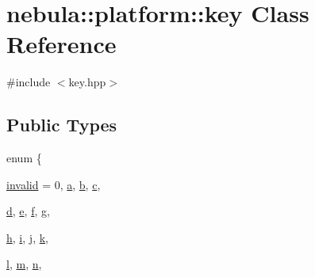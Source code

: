 \hypertarget{classnebula_1_1platform_1_1key}{
\section{nebula::platform::key Class Reference}
\label{classnebula_1_1platform_1_1key}
}


{\ttfamily \#include $<$key.hpp$>$}\subsection*{Public Types}
\begin{DoxyCompactItemize}
\item 
enum \{ \par
\hyperlink{classnebula_1_1platform_1_1key_a1e8e89eec822fa503cad8fdee1ffe81daf4e440bf9920607f965f98e4f693991a}{invalid} =  0, 
\hyperlink{classnebula_1_1platform_1_1key_a1e8e89eec822fa503cad8fdee1ffe81da3a547ef682c6c9f2fd369c507d840ad2}{a}, 
\hyperlink{classnebula_1_1platform_1_1key_a1e8e89eec822fa503cad8fdee1ffe81da70b6d7aff08309dea5ca4571d644575e}{b}, 
\hyperlink{classnebula_1_1platform_1_1key_a1e8e89eec822fa503cad8fdee1ffe81daa41f12fef0bf40fdeff6e5d124c24847}{c}, 
\par
\hyperlink{classnebula_1_1platform_1_1key_a1e8e89eec822fa503cad8fdee1ffe81dae37ffebee8fe750c58300b8d5a584e1e}{d}, 
\hyperlink{classnebula_1_1platform_1_1key_a1e8e89eec822fa503cad8fdee1ffe81dabbba1f5c8364befe1a0c923536232983}{e}, 
\hyperlink{classnebula_1_1platform_1_1key_a1e8e89eec822fa503cad8fdee1ffe81daafe4cae3906d9a5e61e79359f9f9439e}{f}, 
\hyperlink{classnebula_1_1platform_1_1key_a1e8e89eec822fa503cad8fdee1ffe81dafa619d2ef468c8ba678c897b6ec3686c}{g}, 
\par
\hyperlink{classnebula_1_1platform_1_1key_a1e8e89eec822fa503cad8fdee1ffe81da28ec1e51592c38ccf52aed89b60b95be}{h}, 
\hyperlink{classnebula_1_1platform_1_1key_a1e8e89eec822fa503cad8fdee1ffe81dabe8a1302593e2da16d0a9b1b6c330c7d}{i}, 
\hyperlink{classnebula_1_1platform_1_1key_a1e8e89eec822fa503cad8fdee1ffe81da283f86ac479d02db5443de3ec65e5a6d}{j}, 
\hyperlink{classnebula_1_1platform_1_1key_a1e8e89eec822fa503cad8fdee1ffe81da2c690ee231660b5d5378147c42231ac7}{k}, 
\par
\hyperlink{classnebula_1_1platform_1_1key_a1e8e89eec822fa503cad8fdee1ffe81da061491f8233235d55b994f061db76283}{l}, 
\hyperlink{classnebula_1_1platform_1_1key_a1e8e89eec822fa503cad8fdee1ffe81da58c873bdaf009d7a9a8d5e25075ceff3}{m}, 
\hyperlink{classnebula_1_1platform_1_1key_a1e8e89eec822fa503cad8fdee1ffe81da1fb952d56f84ce4a06568fb1dcf8818a}{n}, 

\end{DoxyCompactItemize}
